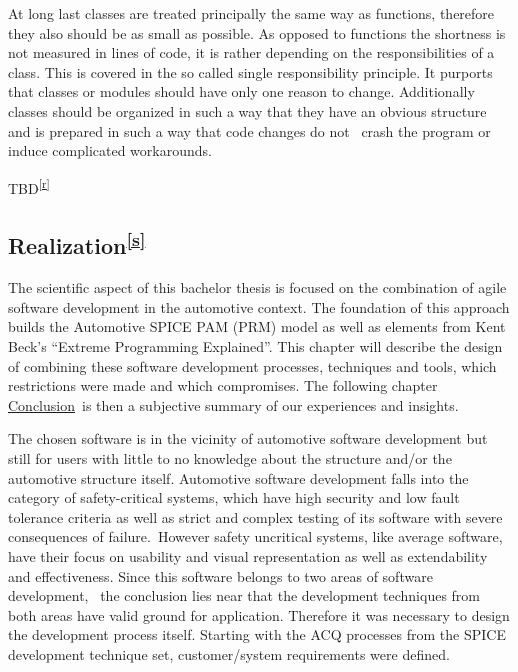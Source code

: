 {At long last c}{lasses are treated principally the same way as
functions, therefore they also should be as small as possible. As
opposed to functions the shortness is not measured in lines of code, it
is rather depending on the responsibilities of a class. This is covered
in the so called single responsibility principle. It purports that
classes or modules should have only one reason to change. Additionally
classes should be organized in such a way that they have an obvious
structure and is prepared in such a way that code changes do not ~crash
the program or induce complicated workarounds.}

{TBD}\textsuperscript{\protect\hyperlink{cmnt18}{{[}r{]}}}{~}

\hypertarget{h.8nawqkcgevsc}{\subsection{\texorpdfstring{{Realization}\textsuperscript{\protect\hyperlink{cmnt19}{{[}s{]}}}}{Realization{[}s{]}}}\label{h.8nawqkcgevsc}}

{The scientific aspect of this bachelor thesis is focused on the
combination of agile software development in the automotive context. The
foundation of this approach builds the Automotive SPICE PAM (PRM) model
as well as elements from Kent Beck's ``}{Extreme Programming
Explained}{''. This chapter will describe the design of combining these
software development processes, techniques and tools, which restrictions
were made and which compromises. The following chapter
}{\protect\hyperlink{h.ox6tol8shjj5}{Conclusion}}{~is then a subjective
summary of our experiences and insights.}

{The chosen software is in the vicinity of automotive software
development but still for users with little to no knowledge about the
structure and/or the automotive structure itself. Automotive software
development falls into the category of safety-critical systems, which
have high security and low fault tolerance criteria as well as strict
and complex testing of its software with severe consequences of
failure.}{~However safety uncritical systems, like average software,
}{have their focus on usability and visual representation as well as
extendability and effectiveness. Since this software belongs to two
areas of software development, ~the conclusion lies near that the
development techniques from both areas have valid ground for
application. Therefore it was necessary to design the development
process itself. Starting with the ACQ processes from the SPICE
development technique set, customer/system requirements were defined.}

